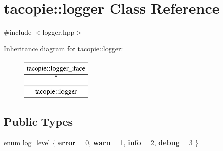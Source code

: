 \hypertarget{classtacopie_1_1logger}{}\section{tacopie\+:\+:logger Class Reference}
\label{classtacopie_1_1logger}


{\ttfamily \#include $<$logger.\+hpp$>$}

Inheritance diagram for tacopie\+:\+:logger\+:\begin{figure}[H]
\begin{center}
\leavevmode
\includegraphics[height=2.000000cm]{classtacopie_1_1logger}
\end{center}
\end{figure}
\subsection*{Public Types}
\begin{DoxyCompactItemize}
\item 
enum \hyperlink{classtacopie_1_1logger_ae7dd235972bbf86a017fc39b3af80efe}{log\+\_\+level} \{ {\bfseries error} = 0, 
{\bfseries warn} = 1, 
{\bfseries info} = 2, 
{\bfseries debug} = 3
 \}
\end{DoxyCompactItemize}
